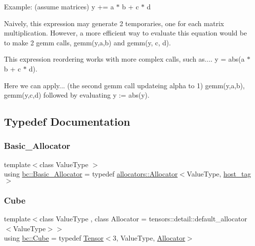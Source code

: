 Example\+: (assume matrices) y += a $\ast$ b + c $\ast$ d

Naively, this expression may generate 2 temporaries, one for each matrix multiplication. However, a more efficient way to evaluate this equation would be to make 2 gemm calls, gemm(y,a,b) and gemm(y, c, d).

This expression reordering works with more complex calls, such as.... y = abs(a $\ast$ b + c $\ast$ d).

Here we can apply... (the second gemm call updateing alpha to 1) gemm(y,a,b), gemm(y,c,d) followed by evaluating y \+:= abs(y). 

\subsection{Typedef Documentation}
\mbox{\label{namespacebc_a08df4c65689bdb7481f0d2d54315e8a6}} 
\subsubsection{\texorpdfstring{Basic\+\_\+\+Allocator}{Basic\_Allocator}}
{\footnotesize\ttfamily template$<$class Value\+Type $>$ \\
using \hyperlink{namespacebc_a08df4c65689bdb7481f0d2d54315e8a6}{bc\+::\+Basic\+\_\+\+Allocator} = typedef \hyperlink{classbc_1_1allocators_1_1Allocator}{allocators\+::\+Allocator}$<$Value\+Type, \hyperlink{structbc_1_1host__tag}{host\+\_\+tag}$>$}

\mbox{\label{namespacebc_a6fe72f55a3d16b9ee2e35beae746af90}} 
\subsubsection{\texorpdfstring{Cube}{Cube}}
{\footnotesize\ttfamily template$<$class Value\+Type , class Allocator  = tensors\+::detail\+::default\+\_\+allocator$<$\+Value\+Type$>$$>$ \\
using \hyperlink{namespacebc_a6fe72f55a3d16b9ee2e35beae746af90}{bc\+::\+Cube} = typedef \hyperlink{namespacebc_a659391e47ab612be3ba6c18cf9c89159}{Tensor}$<$3, Value\+Type, \hyperlink{classbc_1_1allocators_1_1Allocator}{Allocator}$>$}

\mbox{\label{namespacebc_a00a6f4634cf1568da58d6b30b25b2b7c}} 
